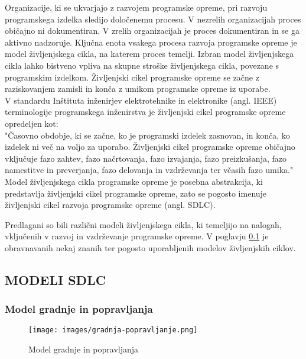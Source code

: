 \documentclass[a4paper,12pt,openright]{book}
\begin{document}
Organizacije, ki se ukvarjajo z razvojem programske opreme, pri razvoju programskega izdelka sledijo določenemu procesu. V nezrelih organizacijah proces običajno ni dokumentiran. V zrelih organizacijah je proces dokumentiran in se ga aktivno nadzoruje. Ključna enota vsakega procesa razvoja programske opreme je model življenjskega cikla, na katerem proces temelji. Izbran model življenjskega cikla lahko bistveno vpliva na skupne stroške življenjskega cikla, povezane s programskim izdelkom. Življenjski cikel programske opreme se začne z raziskovanjem zamisli in konča z umikom programske opreme iz uporabe. \\
V standardu Inštituta inženirjev elektrotehnike in elektronike (angl. IEEE) terminologije programskega inženirstva je življenjski cikel programske opreme opredeljen kot: \\
"Časovno obdobje, ki se začne, ko je programski izdelek zasnovan, in konča, ko izdelek ni več na voljo za uporabo. Življenjski cikel programske opreme običajno vključuje fazo zahtev, fazo načrtovanja, fazo izvajanja, fazo preizkušanja, fazo namestitve in preverjanja, fazo delovanja in vzdrževanja ter včasih fazo umika." \\
Model življenjskega cikla programske opreme je posebna abstrakcija, ki predstavlja življenjski cikel programske opreme, zato se pogosto imenuje življenjski cikel razvoja programske opreme (angl. SDLC). \cite{aggarwal2005software}


Predlagani so bili različni modeli življenjskega cikla, ki temeljijo na nalogah, vključenih v razvoj in vzdrževanje programske opreme. V poglavju \ref{chap:SDLC} je obravnavanih nekaj znanih ter pogosto uporabljenih modelov življenjskih ciklov.
\subsection{MODELI SDLC} \label{chap:SDLC}
\subsubsection{Model gradnje in popravljanja}
\begin{figure}[H]
    \centering
    \texttt{[image: images/gradnja-popravljanje.png]}
    \caption{Model gradnje in popravljanja}
    \label{fig:gradnja}
\end{figure}
\end{document}
